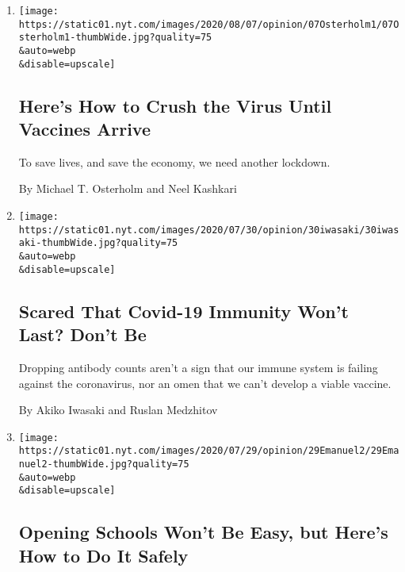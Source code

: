 \begin{enumerate}
\def\labelenumi{\arabic{enumi}.}
\item
  \href{/2020/08/07/opinion/coronavirus-lockdown-unemployment-death.html}{}

  \texttt{[image: https://static01.nyt.com/images/2020/08/07/opinion/07Osterholm1/07Osterholm1-thumbWide.jpg?quality=75\\\&auto=webp\\\&disable=upscale]}

  \hypertarget{heres-how-to-crush-the-virus-until-vaccines-arrive}{%
  \subsection{Here's How to Crush the Virus Until Vaccines
  Arrive}\label{heres-how-to-crush-the-virus-until-vaccines-arrive}}

  To save lives, and save the economy, we need another lockdown.

  By Michael T. Osterholm and Neel Kashkari
\item
  \href{/2020/07/31/opinion/coronavirus-antibodies-immunity.html}{}

  \texttt{[image: https://static01.nyt.com/images/2020/07/30/opinion/30iwasaki/30iwasaki-thumbWide.jpg?quality=75\\\&auto=webp\\\&disable=upscale]}

  \hypertarget{scared-that-covid-19-immunity-wont-last-dont-be}{%
  \subsection{Scared That Covid-19 Immunity Won't Last? Don't
  Be}\label{scared-that-covid-19-immunity-wont-last-dont-be}}

  Dropping antibody counts aren't a sign that our immune system is
  failing against the coronavirus, nor an omen that we can't develop a
  viable vaccine.

  By Akiko Iwasaki and Ruslan Medzhitov
\item
  \href{/2020/07/29/opinion/coronavirus-schools-reopen.html}{}

  \texttt{[image: https://static01.nyt.com/images/2020/07/29/opinion/29Emanuel2/29Emanuel2-thumbWide.jpg?quality=75\\\&auto=webp\\\&disable=upscale]}

  \hypertarget{opening-schools-wont-be-easy-but-heres-how-to-do-it-safely}{%
  \subsection{Opening Schools Won't Be Easy, but Here's How to Do It
  Safely}\label{opening-schools-wont-be-easy-but-heres-how-to-do-it-safely}}


\end{enumerate}
